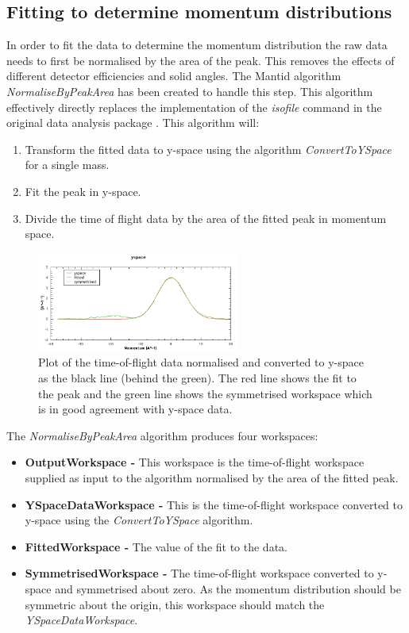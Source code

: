 \documentclass[paper=a4, fontsize=11pt]{scrartcl}	%
\numberwithin{equation}{section}															%
\numberwithin{figure}{section}																%
\numberwithin{table}{section}
\begin{document}
\subsection{Fitting to determine momentum distributions}
\label{subsec:fitting-momentum-distributions}
In order to fit the data to determine the momentum distribution the raw data needs to first be normalised by the area of the peak. This removes the effects of different detector efficiencies and solid angles. The Mantid algorithm \textit{NormaliseByPeakArea} has been created to handle this step. This algorithm effectively directly replaces the implementation of the \textit{isofile} command in the original data analysis package \cite{mayers2010user}. This algorithm will:

\begin{enumerate}
\item Transform the fitted data to y-space using the algorithm \textit{ConvertToYSpace} for a single mass.
\item Fit the peak in y-space.
\item Divide the time of flight data by the area of the fitted peak in momentum space.
\end{enumerate}

\begin{figure}[H]
\centering
\includegraphics[width=0.6\textwidth]{img/yspace-norm.png}
\caption{Plot of the time-of-flight data normalised and converted to y-space as the black line (behind the green). The red line shows the fit to the peak and the green line shows the symmetrised workspace which is in good agreement with y-space data.}
\label{fig:yspace-norm}
\end{figure}

The \textit{NormaliseByPeakArea} algorithm produces four workspaces:

\begin{itemize}
\item \textbf{OutputWorkspace - } This workspace is the time-of-flight workspace supplied as input to the algorithm normalised by the area of the fitted peak.
\item \textbf{YSpaceDataWorkspace - } This is the time-of-flight workspace converted to y-space using the \textit{ConvertToYSpace} algorithm.
\item \textbf{FittedWorkspace - } The value of the fit to the data.
\item \textbf{SymmetrisedWorkspace - } The time-of-flight workspace converted to y-space and symmetrised about zero. As the momentum distribution should be symmetric about the origin, this workspace should match the \textit{YSpaceDataWorkspace}.
\end{itemize}
\end{document}
